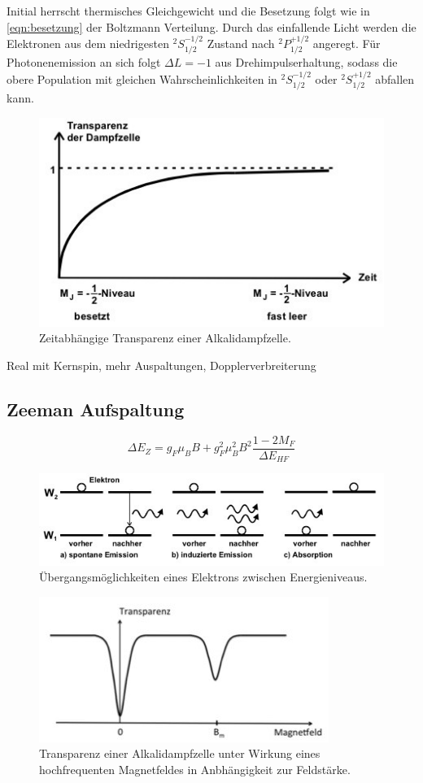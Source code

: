 Initial herrscht thermisches Gleichgewicht und die Besetzung folgt wie in \eqref{eqn:besetzung} der Boltzmann Verteilung. Durch das
einfallende Licht werden die Elektronen aus dem niedrigesten $^2S_{1/2}^{-1/2}$ Zustand nach $^2P_{1/2}^{+1/2}$ angeregt. Für
Photonenemission an sich folgt $\Delta L = -1$ aus Drehimpulserhaltung, sodass die obere Population mit gleichen Wahrscheinlichkeiten
in $^2S_{1/2}^{-1/2}$ oder $^2S_{1/2}^{+1/2}$ abfallen kann.

\begin{figure}[H]
	\centering
	\includegraphics[width=0.6\linewidth]{content/grafik/transparenz.jpg}
	\caption{Zeitabhängige Transparenz einer Alkalidampfzelle. \cite{pumpen}}
	\label{fig:transparenz}
\end{figure}

Real mit Kernspin, mehr Auspaltungen, Dopplerverbreiterung 

\subsection{Zeeman Aufspaltung}

\begin{equation}
	\Delta E_Z = g_F \mu_B B + g_F^2 \mu_B^2 B^2 \frac{1 - 2M_F}{\Delta E_{HF}}
	\label{eqn:quad_zeeman}
\end{equation}

\begin{figure}[H]
	\centering
	\includegraphics[width=0.75\linewidth]{content/grafik/uebergang.jpg}
	\caption{Übergangsmöglichkeiten eines Elektrons zwischen Energieniveaus. \cite{pumpen}}
	\label{fig:uebergang}
\end{figure}

\begin{figure}[H]
	\centering
	\includegraphics[width=0.6\linewidth]{content/grafik/minima.jpg}
	\caption{Transparenz einer Alkalidampfzelle unter Wirkung eines hochfrequenten Magnetfeldes in Anbhängigkeit
			 zur Feldstärke. \cite{pumpen}}
	\label{fig:minima}
\end{figure}


